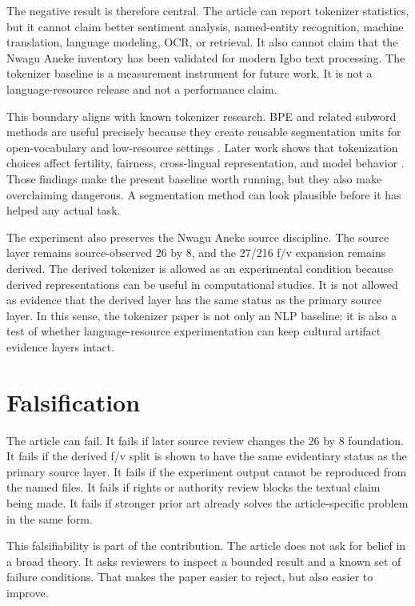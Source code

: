 \documentclass[sigconf,nonacm]{acmart}
\begin{document}
The negative result is therefore central. The article can report tokenizer
statistics, but it cannot claim better sentiment analysis, named-entity
recognition, machine translation, language modeling, OCR, or retrieval. It also
cannot claim that the Nwagu Aneke inventory has been validated for modern Igbo
text processing. The tokenizer baseline is a measurement instrument for future
work. It is not a language-resource release and not a performance claim.

This boundary aligns with known tokenizer research. BPE and related subword
methods are useful precisely because they create reusable segmentation units for
open-vocabulary and low-resource settings \cite{sennrich2016bpe,kudo2018sentencepiece}.
Later work shows that tokenization choices affect fertility, fairness,
cross-lingual representation, and model behavior \cite{bostrom2020bytepair,rust2021tokenization}.
Those findings make the present baseline worth running, but they also make
overclaiming dangerous. A segmentation method can look plausible before it has
helped any actual task.

The experiment also preserves the Nwagu Aneke source discipline. The source
layer remains source-observed 26 by 8, and the 27/216 f/v expansion remains
derived. The derived tokenizer is allowed as an experimental condition because
derived representations can be useful in computational studies. It is not
allowed as evidence that the derived layer has the same status as the primary
source layer. In this sense, the tokenizer paper is not only an NLP baseline; it
is also a test of whether language-resource experimentation can keep cultural
artifact evidence layers intact.

\section{Falsification}
The article can fail. It fails if later source review changes the 26 by 8
foundation. It fails if the derived f/v split is shown to have the same
evidentiary status as the primary source layer. It fails if the experiment output
cannot be reproduced from the named files. It fails if rights or authority review
blocks the textual claim being made. It fails if stronger prior art already
solves the article-specific problem in the same form.

This falsifiability is part of the contribution. The article does not ask for
belief in a broad theory. It asks reviewers to inspect a bounded result and a
known set of failure conditions. That makes the paper easier to reject, but also
easier to improve.
\end{document}
